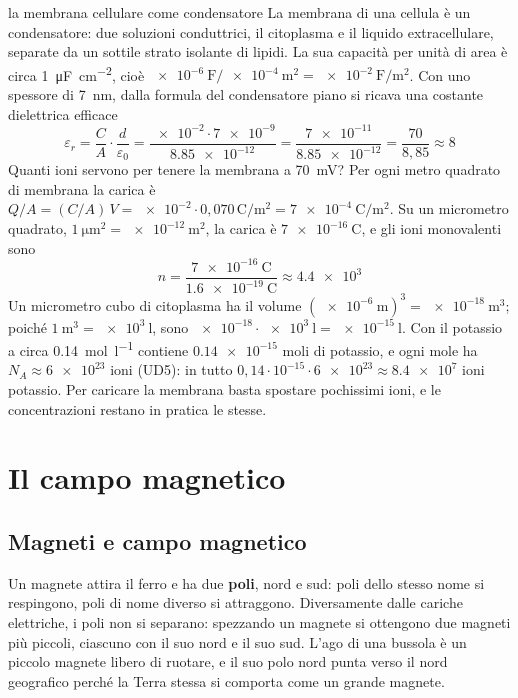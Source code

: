 \begin{applicazione}{la membrana cellulare come condensatore}
La membrana di una cellula è un condensatore: due soluzioni conduttrici, il citoplasma e il liquido extracellulare, separate da un sottile strato isolante di lipidi. La sua capacità per unità di area è circa \SI{1}{\micro\farad\per\centi\metre\squared}, cioè $\SI{e-6}{\farad}/\SI{e-4}{\metre\squared} = \SI{e-2}{\farad\per\metre\squared}$. Con uno spessore di \SI{7}{\nano\metre}, dalla formula del condensatore piano si ricava una costante dielettrica efficace
\[
  \varepsilon_r = \frac{C}{A} \cdot \frac{d}{\varepsilon_0} = \frac{\num{e-2} \cdot \num{7e-9}}{\num{8,85e-12}} = \frac{\num{7e-11}}{\num{8,85e-12}} = \frac{70}{8{,}85} \approx 8
\]
Quanti ioni servono per tenere la membrana a \SI{70}{\milli\volt}? Per ogni metro quadrato di membrana la carica è $Q/A = (C/A)\,V = \num{e-2} \cdot 0{,}070\,\si{\coulomb\per\metre\squared} = \SI{7e-4}{\coulomb\per\metre\squared}$. Su un micrometro quadrato, $\SI{1}{\micro\metre\squared} = \SI{e-12}{\metre\squared}$, la carica è $\SI{7e-16}{\coulomb}$, e gli ioni monovalenti sono
\[
  n = \frac{\SI{7e-16}{\coulomb}}{\SI{1,6e-19}{\coulomb}} \approx \num{4,4e3}
\]
Un micrometro cubo di citoplasma ha il volume $(\SI{e-6}{\metre})^{3} = \SI{e-18}{\metre\cubed}$; poiché $\SI{1}{\metre\cubed} = \SI{e3}{\litre}$, sono $\num{e-18} \cdot \SI{e3}{\litre} = \SI{e-15}{\litre}$. Con il potassio a circa \SI{0,14}{\mole\per\litre} contiene $\num{0,14e-15}$ moli di potassio, e ogni mole ha $N_A \approx \num{6e23}$ ioni (UD5): in tutto $0{,}14 \cdot 10^{-15} \cdot \num{6e23} \approx \num{8,4e7}$ ioni potassio. Per caricare la membrana basta spostare pochissimi ioni, e le concentrazioni restano in pratica le stesse.
\end{applicazione}

\section{Il campo magnetico}
\label{sec:ud6-magnetico}

\subsection{Magneti e campo magnetico}

Un magnete attira il ferro e ha due \textbf{poli}, nord e sud: poli dello stesso nome si respingono, poli di nome diverso si attraggono. Diversamente dalle cariche elettriche, i poli non si separano: spezzando un magnete si ottengono due magneti più piccoli, ciascuno con il suo nord e il suo sud. L'ago di una bussola è un piccolo magnete libero di ruotare, e il suo polo nord punta verso il nord geografico perché la Terra stessa si comporta come un grande magnete.


